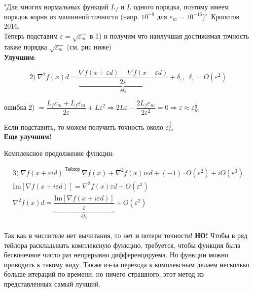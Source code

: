 "Для многих нормальных функций $L_f$ и $L$ одного порядка, поэтому имеем порядок корня из машинной точности (напр. $10^{-8}$ для $\varepsilon_m = 10^{-16}$)"\ Кропотов 2016.
\\

Теперь подставим $\varepsilon = \sqrt{\varepsilon_m}$ в 1) и получим что наилучшая достижимая точность также порядка $\sqrt{\varepsilon_m}$ (см. рис ниже)
\\

\textbf{Улучшим}:

\[
    2)\ \nabla^2 f(x) d = \underbrace{\dfrac{\nabla f(x+\varepsilon d) - \nabla f (x-\varepsilon d)}{2\varepsilon}}_{\Theta_2} + \delta_\varepsilon, \ \ \delta_\varepsilon = O(\varepsilon^2)
\]

ошибка 2) $= \dfrac{L_f\varepsilon_m + L_f\varepsilon_m}{2\varepsilon} + L\varepsilon^2 \Rightarrow 2L\varepsilon - \dfrac{2L_f\varepsilon_m}{2\varepsilon^2} = 0 \Rightarrow
\varepsilon \approx \varepsilon_m^{\frac{1}{3}}
$

Если подставить, то можем получить точность около $\varepsilon_m^{\frac{2}{3}}$
\\

\textbf{Еще улучшим!}

Комплексное продолжение функции:

\begin{gather*}
    3)\ \nabla f(x+\varepsilon id) \overset{\text{Тейлор}}{=} \nabla f(x) + \nabla^2f(x)i\varepsilon d + (-1)\cdot O(\varepsilon^2) + iO(\varepsilon^3)\\
    \text{Im}[\nabla f(x+i\varepsilon d)] = \nabla^2f(x)\varepsilon d + O(\varepsilon^3)\\
    \nabla^2f(x)d = \underbrace{\dfrac{\text{Im}[\nabla f(x+i \varepsilon d)]}{\varepsilon}}_{\Theta_3} + O(\varepsilon^2)\\
\end{gather*}

Так как в числителе нет вычитания, то нет и потери точности! \textbf{НО!} Чтобы в ряд тейлора раскладывать комплексную функцию, требуется, чтобы функция была бесконечное число раз непрерывно дифференцируема. Но функции можно приводить к такому виду. Также из-за перехода к комплексным делаем несколько больше итераций по времени, но ничего страшного, этот метод из представленных самый лучший.



